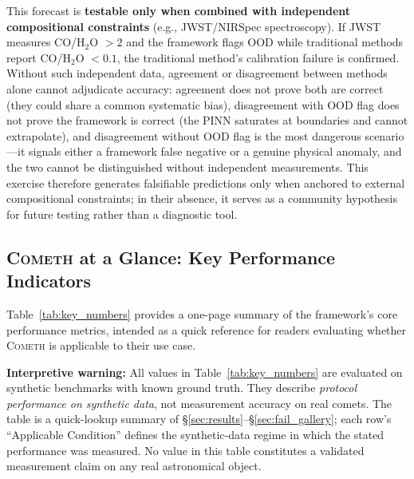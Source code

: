 \documentclass[usenatbib]{mnras}
\begin{document}
This forecast is \textbf{testable only when combined with independent compositional constraints} (e.g., JWST/NIRSpec spectroscopy). If JWST measures CO/H$_2$O $> 2$ and the framework flags OOD while traditional methods report CO/H$_2$O $< 0.1$, the traditional method's calibration failure is confirmed. Without such independent data, agreement or disagreement between methods alone cannot adjudicate accuracy: agreement does not prove both are correct (they could share a common systematic bias), disagreement with OOD flag does not prove the framework is correct (the PINN saturates at boundaries and cannot extrapolate), and disagreement without OOD flag is the most dangerous scenario---it signals either a framework false negative or a genuine physical anomaly, and the two cannot be distinguished without independent measurements. This exercise therefore generates falsifiable predictions only when anchored to external compositional constraints; in their absence, it serves as a community hypothesis for future testing rather than a diagnostic tool.

\subsection{\texorpdfstring{\textsc{Cometh}}{COMETH} at a Glance: Key Performance Indicators}

Table~\ref{tab:key_numbers} provides a one-page summary of the framework's core performance metrics, intended as a quick reference for readers evaluating whether \textsc{Cometh} is applicable to their use case.

\textbf{Interpretive warning:} All values in Table~\ref{tab:key_numbers} are evaluated on synthetic benchmarks with known ground truth. They describe \textit{protocol performance on synthetic data}, not measurement accuracy on real comets. The table is a quick-lookup summary of \S\ref{sec:results}--\S\ref{sec:fail_gallery}; each row's ``Applicable Condition'' defines the synthetic-data regime in which the stated performance was measured. No value in this table constitutes a validated measurement claim on any real astronomical object.
\end{document}
